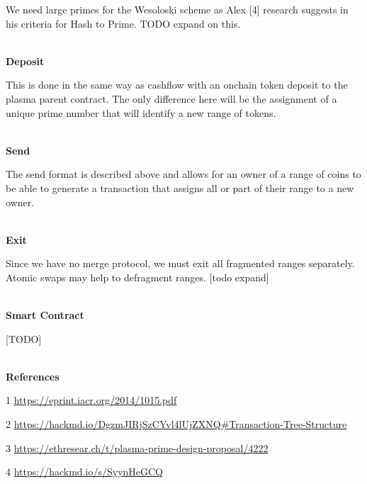 \documentclass[12pt]{article}
\begin{document}
We need large primes for the Wesoloski scheme as Alex [4] research suggests in his criteria for Hash to Prime. TODO expand on this. 
\\ 
\\
\centerline{\textbf{Deposit}}

This is done in the same way as cashflow with an onchain token deposit to the plasma parent contract. The only difference here will be the assignment of a unique prime number that will identify a new range of tokens. 
\\
\\
\centerline{\textbf{Send}}

The send format is described above and allows for an owner of a range of coins to be able to generate a transaction that assigns all or part of their range to a new owner. 
\\
\\
\centerline{\textbf{Exit}}

Since we have no merge protocol, we must exit all fragmented ranges separately. Atomic swaps may help to defragment ranges. [todo expand]
\\
\\
\centerline{\textbf{Smart Contract}}

[TODO]
\\
\\
\centerline{\textbf{References}}

1 \url{https://eprint.iacr.org/2014/1015.pdf}

2 \url{https://hackmd.io/DgzmJIRjSzCYvl4lUjZXNQ#Transaction-Tree-Structure}

3 \url{https://ethresear.ch/t/plasma-prime-design-proposal/4222}

4 \url{https://hackmd.io/s/SyynHeGCQ}
\end{document}
